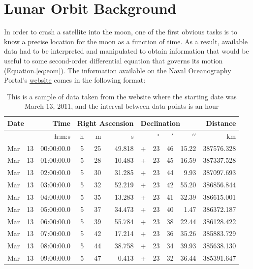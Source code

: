 \documentclass{article}
\begin{document}
\section{Lunar Orbit Background}

In order to crash a satellite into the moon, one of the first obvious
tasks is to know a precise location for the moon as a function of
time.
As a result, available data had to be interpreted and manipulated to
obtain information that would be useful to some second-order
differential equation that governs its motion (Equation.\ref{eq:eom}).
The information available on the Naval Oceanography Portal's
\href{http://www.usno.navy.mil/USNO/astronomical-applications/data-services/geo-pos}{website}
comes in the following format:
\\
\noindent
\begin{table}[H]\centering
\begin{tabular}{r r r r r r r r r r r}
  \multicolumn{2}{l}{Date} & Time & \multicolumn{3}{l}{Right Ascension} &
  \multicolumn{4}{l}{Declination} & Distance \\ 
  \hline
  & & h:m:s & h & m & s & & $^\circ$ & $\prime$ & $\prime\prime$ & km
  \\ 
  Mar & 13 & 00:00:00.0 & 5 & 25 & 49.818 & + & 23 & 46 & 15.22 &
  387576.328 \\
  Mar & 13 & 01:00:00.0 & 5 & 28 & 10.483 & + & 23 & 45 & 16.59 &
  387337.528 \\
  Mar & 13 & 02:00:00.0 & 5 & 30 & 31.285 & + & 23 & 44 & 9.93 &
  387097.693 \\
  Mar & 13 & 03:00:00.0 & 5 & 32 & 52.219 & + & 23 & 42 & 55.20 &
  386856.844 \\
  Mar & 13 & 04:00:00.0 & 5 & 35 & 13.283 & + & 23 & 41 & 32.39 &
  386615.001 \\
  Mar & 13 & 05:00:00.0 & 5 & 37 & 34.473 & + & 23 & 40 & 1.47 &
  386372.187 \\
  Mar & 13 & 06:00:00.0 & 5 & 39 & 55.784 & + & 23 & 38 & 22.44 &
  386128.422 \\
  Mar & 13 & 07:00:00.0 & 5 & 42 & 17.214 & + & 23 & 36 & 35.26 &
  385883.729 \\
  Mar & 13 & 08:00:00.0 & 5 & 44 & 38.758 & + & 23 & 34 & 39.93 &
  385638.130 \\
  Mar & 13 & 09:00:00.0 & 5 & 47 & 0.413 & + & 23 & 32 & 36.44 &
  385391.647 \\
\end{tabular}
\caption{This is a sample of data taken from the website where the
  starting date was March 13, 2011, and the interval between data points
  is an hour}
\label{tab:sampledata}  
\end{table}
\end{document}

